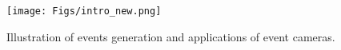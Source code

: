



\begin{figure}[t]
    \setlength{\abovecaptionskip}{0.25cm} %
    \setlength{\belowcaptionskip}{-0.3cm}
    \setlength{\subfigcapskip}{-0.25cm}
    \centering
        \texttt{[image: Figs/intro\_new.png]}
        \vspace{-0.2cm}
    \caption{Illustration of events generation and applications of event cameras.}
    \label{intro}
    \vspace{-0.3cm}
\end{figure} 

